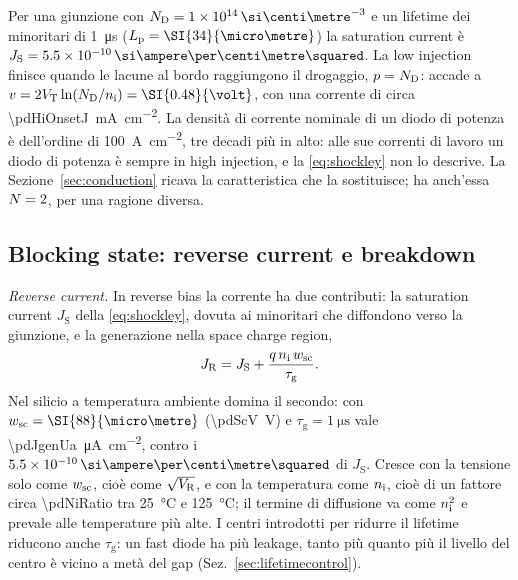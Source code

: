 \documentclass[10pt,a4paper]{scrartcl}
\let\newcommand\pdvaluedefine
\newcommand{\VR}{V_\mathrm{R}}
\newcommand{\VT}{V_\mathrm{T}}
\newcommand{\Nem}{N}                          %
\newcommand{\ND}{N_\mathrm{D}}
\newcommand{\nint}{n_\mathrm{i}}
\newcommand{\wsc}{w_\mathrm{sc}}
\newcommand{\Pp}{p\textsuperscript{+}}
\newcommand{\Nm}{n\textsuperscript{--}}
\newcommand{\cmc}{\si{\centi\metre^{-3}}}
\newcommand{\Acm}{\si{\ampere\per\centi\metre\squared}}
\begin{document}
Per una giunzione \Pp\Nm{} con $\ND = \pdExNd\,\cmc$ e un lifetime dei minoritari di \SI{1}{\micro\second} ($L_\mathrm{p} = \SI{\pdLpOne}{\micro\metre}$) la saturation current è $J_\mathrm{S} = \pdJsShockley\,\Acm$. La low injection finisce quando le lacune al bordo raggiungono il drogaggio, $p = \ND$: accade a $v = 2\VT\ln(\ND/\nint) = \SI{\pdHiOnsetV}{\volt}$, con una corrente di circa \SI{\pdHiOnsetJ}{\milli\ampere\per\centi\metre\squared}. La densità di corrente nominale di un diodo di potenza è dell'ordine di \SI{100}{\ampere\per\centi\metre\squared}, tre decadi più in alto: alle sue correnti di lavoro un diodo di potenza è sempre in high injection, e la \eqref{eq:shockley} non lo descrive. La Sezione~\ref{sec:conduction} ricava la caratteristica che la sostituisce; ha anch'essa $\Nem = 2$, per una ragione diversa.

\subsection{Blocking state: reverse current e breakdown}
\label{sec:blockingphys}
\emph{Reverse current.} In reverse bias la corrente ha due contributi: la saturation current $J_\mathrm{S}$ della \eqref{eq:shockley}, dovuta ai minoritari che diffondono verso la giunzione, e la generazione nella space charge region,
\begin{equation}
J_\mathrm{R} = J_\mathrm{S} + \frac{q\,\nint\,\wsc}{\tau_\mathrm{g}} .
\label{eq:jgen}
\end{equation}
Nel silicio a temperatura ambiente domina il secondo: con $\wsc = \SI{\pdScW}{\micro\metre}$ (\SI{\pdScV}{\volt}) e $\tau_\mathrm{g} = \SI{1}{\micro\second}$ vale \SI{\pdJgenUa}{\micro\ampere\per\centi\metre\squared}, contro i $\pdJsShockley\,\Acm$ di $J_\mathrm{S}$. Cresce con la tensione solo come $\wsc$, cioè come $\sqrt{\VR}$, e con la temperatura come $\nint$, cioè di un fattore circa \num{\pdNiRatio} tra \SI{25}{\celsius} e \SI{125}{\celsius}; il termine di diffusione va come $\nint^2$ e prevale alle temperature più alte. I centri introdotti per ridurre il lifetime riducono anche $\tau_\mathrm{g}$: un fast diode ha più leakage, tanto più quanto più il livello del centro è vicino a metà del gap (Sez.~\ref{sec:lifetimecontrol}).
\end{document}
